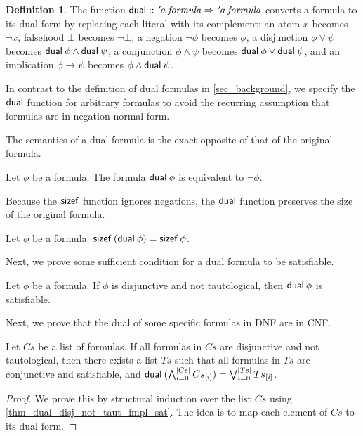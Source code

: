 \documentclass[a4paper,USenglish,cleveref, autoref, thm-restate]{lipics-v2021}
\theoremstyle{definition}
\newtheorem{definitionx}[theorem]{Definition}
\begin{document}
\begin{definitionx}
  \label{def_dual}
  The function $\mathsf{dual} \mathrel{::} {\thinspace'}{\kern-.175ex a} \> \mathit{formula} \Rightarrow {\thinspace'}{\kern-.175ex a} \> \mathit{formula}$ converts a formula to its dual form by replacing each literal with its complement:
  an atom $x$ becomes $\neg x$,
  falsehood $\bot$ becomes $\neg\bot$,
  a negation $\neg \phi$ becomes $\phi$,
  a disjunction $\phi \lor \psi$ becomes $\mathsf{dual} \> \phi \land \mathsf{dual} \> \psi$,
  a conjunction $\phi \land \psi$ becomes $\mathsf{dual} \> \phi \lor \mathsf{dual} \> \psi$, and
  an implication $\phi \rightarrow \psi$ becomes $\phi \land \mathsf{dual} \> \psi$.
\end{definitionx}

\begin{remark*}
  In contrast to the definition of dual formulas in \cref{sec_background}, we specify the $\mathsf{dual}$ function for arbitrary formulas to avoid the recurring assumption that formulas are in negation normal form.
\end{remark*}

The semantics of a dual formula is the exact opposite of that of the original formula.

\begin{lemma}
  \label{thm_equiv_dual}
  Let $\phi$ be a formula.
  The formula $\mathsf{dual} \> \phi$ is equivalent to $\neg\phi$.
\end{lemma}

Because the $\mathsf{sizef}$ function ignores negations, the $\mathsf{dual}$ function preserves the size of the original formula.

\begin{lemma}
	\label{thm_sizef_dual}
  Let $\phi$ be a formula.
  $\mathsf{sizef} \> (\mathsf{dual} \> \phi) = \mathsf{sizef} \> \phi$.
\end{lemma}

Next, we prove some sufficient condition for a dual formula to be satisfiable.

\begin{lemma}
  \label{thm_dual_disj_not_taut_impl_sat}
	Let $\phi$ be a formula.
	If $\phi$ is disjunctive and not tautological,
	then $\mathsf{dual} \> \phi$ is satisfiable.
\end{lemma}

Next, we prove that the dual of some specific formulas in DNF are in CNF.

\begin{lemma}
  \label{thm_dual_conj_of_disjs_is_disj_of_conjs}
  Let $Cs$ be a list of formulas.
  If all formulas in $Cs$ are disjunctive and not tautological,
  then there exists a list $Ts$ such that all formulas in $Ts$ are conjunctive and satisfiable, and $\mathsf{dual} \> (\bigwedge_{i = 0}^{\left|Cs\right|} {Cs}_{[i]}) = \bigvee_{i = 0}^{\left|Ts\right|} {Ts}_{[i]}$.
\end{lemma}
\begin{proof}
  We prove this by structural induction over the list $Cs$ using \cref{thm_dual_disj_not_taut_impl_sat}.
  The idea is to map each element of $Cs$ to its dual form.
\end{proof}
\end{document}
